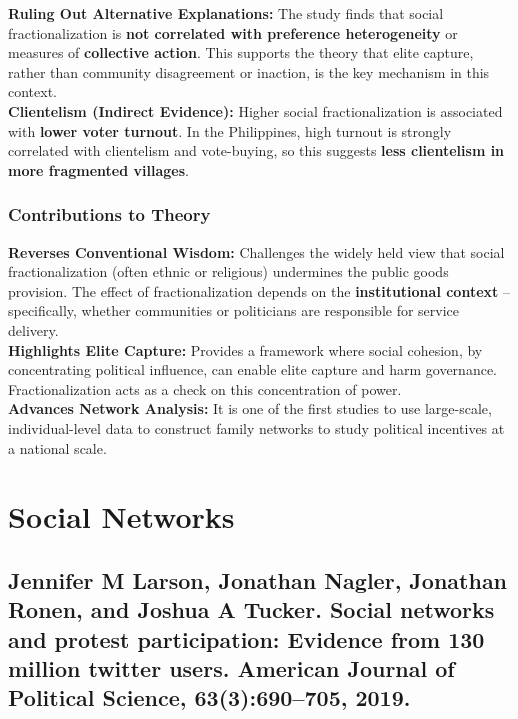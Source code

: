 \documentclass{article}
\begin{document}
    \noindent \textbf{Ruling Out Alternative Explanations:} The study finds that social fractionalization is
        \textbf{not correlated with preference heterogeneity} or measures of \textbf{collective action}. This supports the theory that elite capture, rather than community disagreement or inaction, is the key mechanism in this context. \\

    \noindent \textbf{Clientelism (Indirect Evidence):} Higher social
fractionalization is associated with \textbf{lower voter turnout}. In the
Philippines, high turnout is strongly correlated with clientelism and
vote-buying, so this suggests
\textbf{less clientelism in more fragmented villages}.

    \subsubsection{Contributions to Theory}

    \noindent \textbf{Reverses Conventional Wisdom:} Challenges the widely
held view that social fractionalization (often ethnic or religious)
undermines the public goods provision. The effect of fractionalization
depends on the \textbf{institutional context} -- specifically, whether
communities or politicians are responsible for service delivery.\\

    \noindent \textbf{Highlights Elite Capture:} Provides a framework where
social cohesion, by concentrating political influence, can enable elite
capture and harm governance. Fractionalization acts as a check on this
concentration of power.\\

    \noindent \textbf{Advances Network Analysis:} It is one of the first
studies to use large-scale, individual-level data to construct family
networks to study political incentives at a national scale.

    \section{Social Networks}

    \subsection{Jennifer M Larson, Jonathan Nagler, Jonathan Ronen, and Joshua A Tucker. Social networks and protest participation: Evidence from 130 million twitter users. American Journal of Political Science, 63(3):690–705, 2019.}
\end{document}
